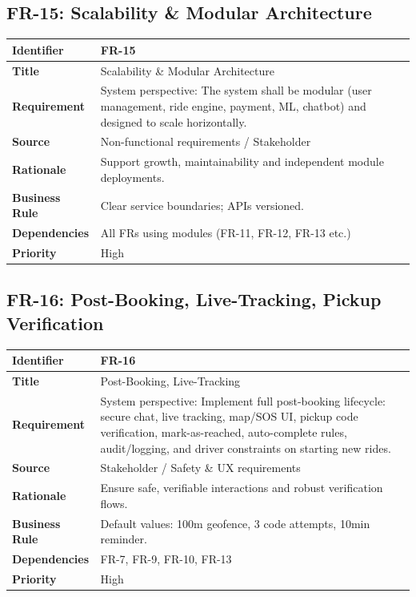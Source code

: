 \subsection{FR-15: Scalability \& Modular Architecture}

\begin{longtable}{|p{3cm}|p{12cm}|}
\hline
\rowcolor{lightgray!30}
\textbf{Identifier} & FR-15 \\
\hline
\textbf{Title} & Scalability \& Modular Architecture \\
\hline
\textbf{Requirement} & System perspective: The system shall be modular (user management, ride engine, payment, ML, chatbot) and designed to scale horizontally. \\
\hline
\textbf{Source} & Non-functional requirements / Stakeholder \\
\hline
\textbf{Rationale} & Support growth, maintainability and independent module deployments. \\
\hline
\textbf{Business Rule} & Clear service boundaries; APIs versioned. \\
\hline
\textbf{Dependencies} & All FRs using modules (FR-11, FR-12, FR-13 etc.) \\
\hline
\textbf{Priority} & High \\
\hline
\end{longtable}

\subsection{FR-16: Post-Booking, Live-Tracking, Pickup Verification}

\begin{longtable}{|p{3cm}|p{12cm}|}
\hline
\rowcolor{lightgray!30}
\textbf{Identifier} & FR-16 \\
\hline
\textbf{Title} & Post-Booking, Live-Tracking \\
\hline
\textbf{Requirement} & System perspective: Implement full post-booking lifecycle: secure chat, live tracking, map/SOS UI, pickup code verification, mark-as-reached, auto-complete rules, audit/logging, and driver constraints on starting new rides. \\
\hline
\textbf{Source} & Stakeholder / Safety \& UX requirements \\
\hline
\textbf{Rationale} & Ensure safe, verifiable interactions and robust verification flows. \\
\hline
\textbf{Business Rule} & Default values: 100m geofence, 3 code attempts, 10min reminder. \\
\hline
\textbf{Dependencies} & FR-7, FR-9, FR-10, FR-13 \\
\hline
\textbf{Priority} & High \\
\hline
\end{longtable}

